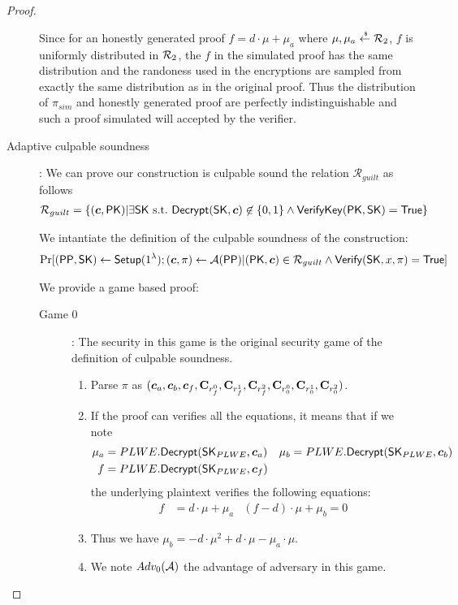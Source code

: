 \begin{proof}
\begin{description}
    Since for an honestly generated proof $f = d \cdot \mu + \mu_a$ where $\mu, \mu_a \stackrel{{\scriptscriptstyle \mkern4mu \$}}{\gets} {\mathcal{R}}_2$, $f$ is uniformly distributed in ${\mathcal{R}}_2$,
    the $f$ in the simulated proof has the same distribution and the randoness used in the encryptions are sampled from exactly the same distribution as in the original proof.
    Thus the distribution of $\pi_{sim}$ and honestly generated proof are perfectly indistinguishable and such a proof simulated will accepted by the verifier.
    
  \item[\textsf{Adaptive culpable soundness}]:
    We can prove our construction is culpable sound \wrt the relation $\mathcal{R}_{guilt}$ as follows
    \begin{align*}
      \mathcal{R}_{guilt} &= \{(\vec{c}, \PK) | \exists \SK~\st~\Dec(\SK, \vec{c}) \not \in \{0,1\}  \wedge {\mathsf{VerifyKey}}(\PK, \SK)  = \True\}
    \end{align*}

    We intantiate the definition of the culpable soundness of the construction:
    \begin{align*}
      \Pr[(\PPP, \SK) \gets \Setup(1^{\lambda}); (\vec{c}, \pi) \gets \Adv(\PPP) | (\PK, \vec{c}) \in \mathcal{R}_{guilt} \wedge \Verif(\SK, x, \pi) = \True]
    \end{align*}

    We provide a game based proof:
    \begin{description}
    \item[\textsf{Game} $0$]: The security in this game is the original security game of the definition of culpable soundness.
      \begin{enumerate}
      \item Parse $\pi$ as $(\vec{c}_a, \vec{c}_b, \vec{c}_f, \mat{C}_{r_f^0}, \mat{C}_{r_f^1}, \mat{C}_{r_f^2}, \mat{C}_{r_0^0}, \mat{C}_{r_0^1}, \mat{C}_{r_0^2})$.
      \item If the proof can verifies all the equations, it means that if we note
        \begin{align*}
          \mu_a &= PLWE.\Dec(\SK_{PLWE}, \vec{c}_a) & \mu_b &= PLWE.\Dec(\SK_{PLWE}, \vec{c}_b) \\
          f &= PLWE.\Dec(\SK_{PLWE}, \vec{c}_f)
        \end{align*}
        the underlying plaintext verifies the following equations:
        \begin{align*}
          f &= d \cdot \mu + \mu_a & (f - d) \cdot \mu + \mu_b = 0
        \end{align*}
      \item Thus we have $\mu_b = - d \cdot \mu^2 + d \cdot \mu - \mu_a \cdot \mu$.
      \item We note $Adv_0(\mathcal{A})$ the advantage of adversary in this game.
      \end{enumerate}


\end{description}
\end{description}
\end{proof}
